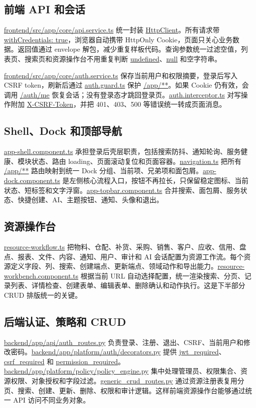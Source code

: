 \documentclass[UTF8,zihao=-4]{ctexart}
\newcommand{\code}[1]{{\small\url{#1}}}
\begin{document}
\subsection{前端 API 和会话}
\code{frontend/src/app/core/api.service.ts} 统一封装 \code{HttpClient}。所有请求带 \code{withCredentials: true}，浏览器自动携带 HttpOnly Cookie，页面只关心业务数据。返回值通过 envelope 解包，减少重复样板代码。查询参数统一过滤空值，列表页、搜索页和资源操作台不用重复判断 \code{undefined}、\code{null} 和空字符串。

\code{frontend/src/app/core/auth.service.ts} 保存当前用户和权限摘要，登录后写入 CSRF token，刷新后通过 \code{auth.guard.ts} 保护 \code{/app/**}。如果 Cookie 仍有效，会调用 \code{/auth/me} 恢复会话；没有登录态才跳回登录页。\code{auth.interceptor.ts} 对写操作附加 \code{X-CSRF-Token}，并把 401、403、500 等错误统一转成页面消息。

\subsection{Shell、Dock 和顶部导航}
\code{app-shell.component.ts} 承担登录后壳层职责，包括搜索防抖、通知轮询、服务健康、模块状态、路由 loading、页面滚动复位和页面容器。\code{navigation.ts} 把所有 \code{/app/**} 路由映射到统一 Dock 分组、当前项、兄弟项和面包屑。\code{app-dock.component.ts} 是左侧核心流程入口，按钮不再拉长，只保留稳定图标、当前状态、短标签和文字浮窗。\code{app-topbar.component.ts} 合并搜索、面包屑、服务状态、快捷创建、AI、主题按钮、通知、头像和退出。

\subsection{资源操作台}
\code{resource-workflow.ts} 把物料、仓配、补货、采购、销售、客户、应收、信用、盘点、报表、文件、内容、通知、用户、审计和 AI 会话配置为资源工作流。每个资源定义字段、列、搜索、创建端点、更新端点、领域动作和导出能力。\code{resource-workbench.component.ts} 根据当前 URL 自动选择配置，统一渲染搜索、分页、记录列表、详情检查、创建表单、编辑表单、删除确认和动作执行。这是下半部分 CRUD 排版统一的关键。

\subsection{后端认证、策略和 CRUD}
\code{backend/app/api/auth_routes.py} 负责登录、注册、退出、CSRF、当前用户和修改密码。\code{backend/app/platform/auth/decorators.py} 提供 \code{jwt_required}、\code{csrf_required} 和 \code{permission_required}。\code{backend/app/platform/policy/policy_engine.py} 集中处理管理员、权限集合、资源权限、对象授权和字段过滤。\code{generic_crud_routes.py} 通过资源注册表复用分页、搜索、创建、更新、删除、权限和审计逻辑。这样前端资源操作台能够通过统一 API 访问不同业务对象。
\end{document}
